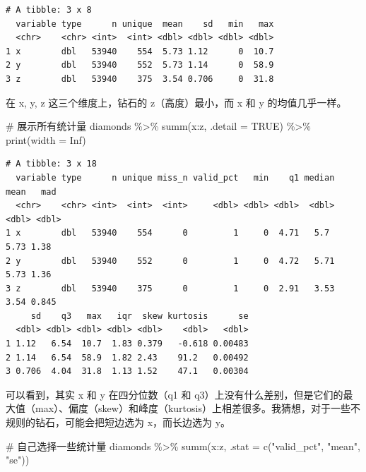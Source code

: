 \documentclass[
  letterpaper,
]{ctexbook}
\newenvironment{Shaded}{\begin{snugshade}}{\end{snugshade}}
\newcommand{\AttributeTok}[1]{\textcolor[rgb]{0.40,0.45,0.13}{#1}}
\newcommand{\CommentTok}[1]{\textcolor[rgb]{0.37,0.37,0.37}{#1}}
\newcommand{\ConstantTok}[1]{\textcolor[rgb]{0.56,0.35,0.01}{#1}}
\newcommand{\FunctionTok}[1]{\textcolor[rgb]{0.28,0.35,0.67}{#1}}
\newcommand{\NormalTok}[1]{\textcolor[rgb]{0.00,0.23,0.31}{#1}}
\newcommand{\SpecialCharTok}[1]{\textcolor[rgb]{0.37,0.37,0.37}{#1}}
\newcommand{\StringTok}[1]{\textcolor[rgb]{0.13,0.47,0.30}{#1}}
\begin{document}
\begin{verbatim}
# A tibble: 3 x 8
  variable type      n unique  mean    sd   min   max
  <chr>    <chr> <int>  <int> <dbl> <dbl> <dbl> <dbl>
1 x        dbl   53940    554  5.73 1.12      0  10.7
2 y        dbl   53940    552  5.73 1.14      0  58.9
3 z        dbl   53940    375  3.54 0.706     0  31.8
\end{verbatim}

在 x, y, z 这三个维度上，钻石的 z（高度）最小，而 x 和 y
的均值几乎一样。

\begin{Shaded}
\begin{Highlighting}[]
\CommentTok{\# 展示所有统计量}
\NormalTok{diamonds }\SpecialCharTok{\%\textgreater{}\%}
  \FunctionTok{summ}\NormalTok{(x}\SpecialCharTok{:}\NormalTok{z, }\AttributeTok{.detail =} \ConstantTok{TRUE}\NormalTok{) }\SpecialCharTok{\%\textgreater{}\%}
  \FunctionTok{print}\NormalTok{(}\AttributeTok{width =} \ConstantTok{Inf}\NormalTok{)}
\end{Highlighting}
\end{Shaded}

\begin{verbatim}
# A tibble: 3 x 18
  variable type      n unique miss_n valid_pct   min    q1 median  mean   mad
  <chr>    <chr> <int>  <int>  <int>     <dbl> <dbl> <dbl>  <dbl> <dbl> <dbl>
1 x        dbl   53940    554      0         1     0  4.71   5.7   5.73 1.38 
2 y        dbl   53940    552      0         1     0  4.72   5.71  5.73 1.36 
3 z        dbl   53940    375      0         1     0  2.91   3.53  3.54 0.845
     sd    q3   max   iqr  skew kurtosis      se
  <dbl> <dbl> <dbl> <dbl> <dbl>    <dbl>   <dbl>
1 1.12   6.54  10.7  1.83 0.379   -0.618 0.00483
2 1.14   6.54  58.9  1.82 2.43    91.2   0.00492
3 0.706  4.04  31.8  1.13 1.52    47.1   0.00304
\end{verbatim}

可以看到，其实 x 和 y 在四分位数（q1 和
q3）上没有什么差别，但是它们的最大值（max）、偏度（skew）和峰度（kurtosis）上相差很多。我猜想，对于一些不规则的钻石，可能会把短边选为
x，而长边选为 y。

\begin{Shaded}
\begin{Highlighting}[]
\CommentTok{\# 自己选择一些统计量}
\NormalTok{diamonds }\SpecialCharTok{\%\textgreater{}\%}
  \FunctionTok{summ}\NormalTok{(x}\SpecialCharTok{:}\NormalTok{z, }\AttributeTok{.stat =} \FunctionTok{c}\NormalTok{(}\StringTok{"valid\_pct"}\NormalTok{, }\StringTok{"mean"}\NormalTok{, }\StringTok{"se"}\NormalTok{))}
\end{Highlighting}
\end{Shaded}
\end{document}

